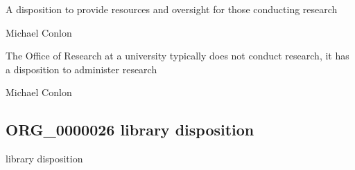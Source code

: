 \documentclass[letterpaper,10pt,english]{sphinxmanual}
\begin{document}
\begin{sphinxShadowBox}

\sphinxAtStartPar
{\hyperref[\detokenize{doc-BFO_0000016::doc}]{}}
\end{sphinxShadowBox}

\begin{sphinxShadowBox}

\sphinxAtStartPar
A disposition to provide resources and oversight for those conducting research
\end{sphinxShadowBox}

\begin{sphinxShadowBox}

\sphinxAtStartPar
Michael Conlon 
\end{sphinxShadowBox}

\begin{sphinxShadowBox}

\sphinxAtStartPar
The Office of Research at a university typically does not conduct research, it has a disposition to administer research
\end{sphinxShadowBox}

\begin{sphinxShadowBox}

\sphinxAtStartPar
Michael Conlon 
\end{sphinxShadowBox}
\begin{quote}

\ignorespaces \end{quote}


\subsection{ORG\_0000026 \sphinxhyphen{} library disposition}
\label{\detokenize{doc-ORG_0000026:org-0000026-library-disposition}}\label{\detokenize{doc-ORG_0000026:index-0}}\label{\detokenize{doc-ORG_0000026::doc}}
\begin{sphinxShadowBox}

\sphinxAtStartPar
library disposition
\end{sphinxShadowBox}
\end{document}
